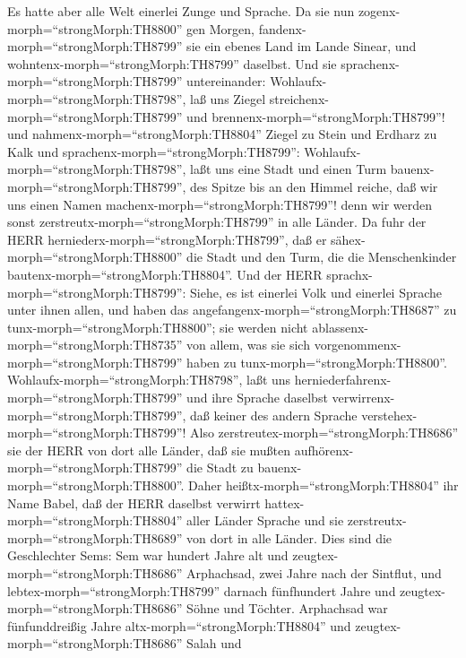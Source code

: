  Es hatte aber alle Welt einerlei Zunge und Sprache.
 Da sie nun zogenx-morph=``strongMorph:TH8800'' gen Morgen,
fandenx-morph=``strongMorph:TH8799'' sie ein ebenes Land im Lande
Sinear, und wohntenx-morph=``strongMorph:TH8799'' daselbst. 
Und sie sprachenx-morph=``strongMorph:TH8799'' untereinander:
Wohlaufx-morph=``strongMorph:TH8798'', laß uns Ziegel
streichenx-morph=``strongMorph:TH8799'' und
brennenx-morph=``strongMorph:TH8799''! und
nahmenx-morph=``strongMorph:TH8804'' Ziegel zu Stein und Erdharz zu Kalk
 und sprachenx-morph=``strongMorph:TH8799'':
Wohlaufx-morph=``strongMorph:TH8798'', laßt uns eine Stadt und einen
Turm bauenx-morph=``strongMorph:TH8799'', des Spitze bis an den Himmel
reiche, daß wir uns einen Namen machenx-morph=``strongMorph:TH8799''!
denn wir werden sonst zerstreutx-morph=``strongMorph:TH8799'' in alle
Länder.  Da fuhr der HERR
herniederx-morph=``strongMorph:TH8799'', daß er
sähex-morph=``strongMorph:TH8800'' die Stadt und den Turm, die die
Menschenkinder bautenx-morph=``strongMorph:TH8804''.  Und
der HERR sprachx-morph=``strongMorph:TH8799'': Siehe, es ist einerlei
Volk und einerlei Sprache unter ihnen allen, und haben das
angefangenx-morph=``strongMorph:TH8687'' zu
tunx-morph=``strongMorph:TH8800''; sie werden nicht
ablassenx-morph=``strongMorph:TH8735'' von allem, was sie sich
vorgenommenx-morph=``strongMorph:TH8799'' haben zu
tunx-morph=``strongMorph:TH8800''. 
Wohlaufx-morph=``strongMorph:TH8798'', laßt uns
herniederfahrenx-morph=``strongMorph:TH8799'' und ihre Sprache daselbst
verwirrenx-morph=``strongMorph:TH8799'', daß keiner des andern Sprache
verstehex-morph=``strongMorph:TH8799''!  Also
zerstreutex-morph=``strongMorph:TH8686'' sie der HERR von dort alle
Länder, daß sie mußten aufhörenx-morph=``strongMorph:TH8799'' die Stadt
zu bauenx-morph=``strongMorph:TH8800''.  Daher
heißtx-morph=``strongMorph:TH8804'' ihr Name Babel, daß der HERR
daselbst verwirrt hattex-morph=``strongMorph:TH8804'' aller Länder
Sprache und sie zerstreutx-morph=``strongMorph:TH8689'' von dort in alle
Länder.  Dies sind die Geschlechter Sems: Sem war hundert
Jahre alt und zeugtex-morph=``strongMorph:TH8686'' Arphachsad, zwei
Jahre nach der Sintflut,  und
lebtex-morph=``strongMorph:TH8799'' darnach fünfhundert Jahre und
zeugtex-morph=``strongMorph:TH8686'' Söhne und Töchter. 
Arphachsad war fünfunddreißig Jahre altx-morph=``strongMorph:TH8804''
und zeugtex-morph=``strongMorph:TH8686'' Salah  und
